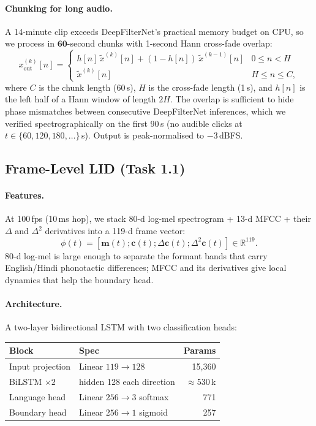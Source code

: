 \documentclass[conference]{IEEEtran}
\begin{document}
\paragraph*{Chunking for long audio.} A 14-minute clip exceeds
DeepFilterNet's practical memory budget on CPU, so we process in
$\mathbf{60}$-second chunks with 1-second Hann cross-fade overlap:
\[
x^{(k)}_{\text{out}}[n] =
\begin{cases}
h[n]\,\tilde{x}^{(k)}[n] + (1{-}h[n])\,\tilde{x}^{(k-1)}[n] & 0 \le n < H \\
\tilde{x}^{(k)}[n] & H \le n \le C,
\end{cases}
\]
where $C$ is the chunk length (60\,s), $H$ is the cross-fade length
(1\,s), and $h[n]$ is the left half of a Hann window of length $2H$.
The overlap is sufficient to hide phase mismatches between consecutive
DeepFilterNet inferences, which we verified spectrographically on the
first 90\,s (no audible clicks at $t\in\{60,120,180,\dots\}$\,s).
Output is peak-normalised to $-3$\,dBFS.

\subsection{Frame-Level LID (Task 1.1)}

\paragraph*{Features.} At 100\,fps (10\,ms hop), we stack 80-d log-mel
spectrogram + 13-d MFCC + their $\Delta$ and $\Delta^{2}$ derivatives
into a 119-d frame vector:
\[
\phi(t) = [\mathbf{m}(t);\mathbf{c}(t);\Delta\mathbf{c}(t);\Delta^{2}\mathbf{c}(t)] \in \mathbb{R}^{119}.
\]
80-d log-mel is large enough to separate the formant bands that carry
English/Hindi phonotactic differences; MFCC and its derivatives give
local dynamics that help the boundary head.

\paragraph*{Architecture.} A two-layer bidirectional LSTM with two
classification heads:

\begin{center}
\scriptsize
\setlength{\tabcolsep}{3pt}
\begin{tabular}{@{}l l r@{}}
\toprule
\textbf{Block} & \textbf{Spec} & \textbf{Params} \\
\midrule
Input projection     & Linear $119 \to 128$            & 15{,}360 \\
BiLSTM $\times 2$    & hidden 128 each direction       & $\approx$530\,k \\
Language head        & Linear $256 \to 3$ softmax      & 771 \\
Boundary head        & Linear $256 \to 1$ sigmoid      & 257 \\
\bottomrule
\end{tabular}
\end{center}
\end{document}

